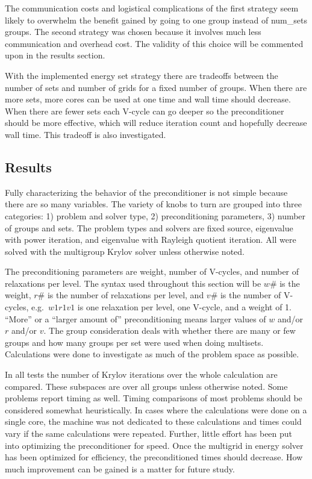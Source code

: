 The communication costs and logistical complications of the first strategy seem likely to overwhelm the benefit gained by going to one group instead of num\_sets groups. The second strategy was chosen because it involves much less communication and overhead cost. The validity of this choice will be commented upon in the results section. 

With the implemented energy set strategy there are tradeoffs between the number of sets and number of grids for a fixed number of groups. When there are more sets, more cores can be used at one time and wall time should decrease. When there are fewer sets each V-cycle can go deeper so the preconditioner should be more effective, which will reduce iteration count and hopefully decrease wall time. This tradeoff is also investigated.

\subsection{Results}
Fully characterizing the behavior of the preconditioner is not simple because there are so many variables. The variety of knobs to turn are grouped into three categories: 1) problem and solver type, 2) preconditioning parameters, 3) number of groups and sets. The problem types and solvers are fixed source, eigenvalue with power iteration, and eigenvalue with Rayleigh quotient iteration. All were solved with the multigroup Krylov solver unless otherwise noted. 

The preconditioning parameters are weight, number of V-cycles, and number of relaxations per level. The syntax used throughout this section will be $w\#$ is the weight, $r\#$ is the number of relaxations per level, and $v\#$ is the number of V-cycles, e.g.\ $w1r1v1$ is one relaxation per level, one V-cycle, and a weight of 1. ``More'' or a ``larger amount of'' preconditioning means larger values of $w$ and/or $r$ and/or $v$. The group consideration deals with whether there are many or few groups and how many groups per set were used when doing multisets. Calculations were done to investigate as much of the problem space as possible.

In all tests the number of Krylov iterations over the whole calculation are compared. These subspaces are over all groups unless otherwise noted. Some problems report timing as well. Timing comparisons of most problems should be considered somewhat heuristically. In cases where the calculations were done on a single core, the machine was not dedicated to these calculations and times could vary if the same calculations were repeated. Further, little effort has been put into optimizing the preconditioner for speed. Once the multigrid in energy solver has been optimized for efficiency, the preconditioned times should decrease. How much improvement can be gained is a matter for future study. 

